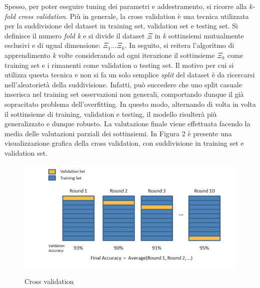\documentclass[11pt]{article}
\begin{document}
Spesso, per poter eseguire tuning dei parametri e addestramento, si ricorre alla \textit{k-fold cross validation}. Più in generale, la cross validation è una tecnica utilizzata per la suddivisione del dataset in training set, validation set e testing set. Si definisce il numero  \textit{fold k} e si divide il dataset $\Xi$ in \textit{k} sottinsiemi mutualmente esclusivi e di ugual dimensione: $\Xi_1 ... \Xi_k$. In seguito, si reitera l'algoritmo di apprendimento \textit{k} volte considerando ad ogni iterazione il sottinsieme $\Xi_k$ come training set e i rimanenti come validation o testing set. Il motivo per cui si utilizza questa tecnica e non si fa un solo semplice \textit{split} del dataset è da ricercarsi nell'aleatorietà della suddivisione. Infatti, può succedere che uno split casuale inserisca nel training set osservazioni non generali, comportando dunque il già sopracitato problema dell'overfitting. In questo modo, alternando di volta in volta il sottinsieme di training, validation e testing, il modello risulterà più generalizzato e dunque robusto. La valutazione finale viene effettuata facendo la media delle valutazioni parziali dei sottinsiemi. In Figura 2 è presente una  visualizzazione grafica della cross validation, con suddivisione in training set e validation set. 

\begin{figure}[h!]
\begin{center}
  \includegraphics[width=13cm]{Immagini/Crossvalidation.png}\\
  \caption{Cross validation}
\end{center}
\end{figure}

	\newpage
\end{document}
